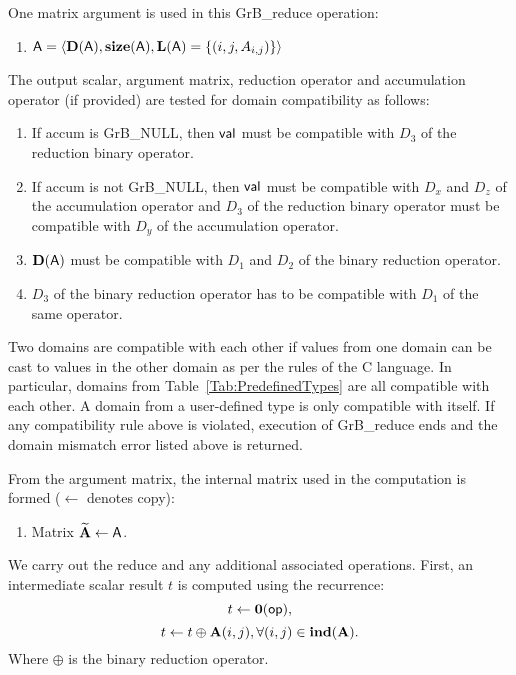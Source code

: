One matrix argument is used in this {\sf GrB\_reduce} operation:
\begin{enumerate}
	\item ${\sf A} = \langle \bold{D}({\sf A}),\bold{size}({\sf A}),
		\bold{L}({\sf A}) = \{(i,j,A_{i,j}) \} \rangle$

\end{enumerate}

The output scalar, argument matrix, reduction operator and accumulation 
operator (if provided) are tested for domain compatibility as follows:
\begin{enumerate}

	\item If {\sf accum} is {\sf GrB\_NULL}, then ${\sf val}$ must be 
    compatible with $D_3$ of the reduction binary operator.

	\item If {\sf accum} is not {\sf GrB\_NULL}, then ${\sf val}$ must be
    compatible with $D_x$ and $D_z$ of the accumulation operator and 
    $D_3$ of the reduction binary operator must be compatible with $D_y$ of the accumulation operator.

	\item $\bold{D}({\sf A})$ must be compatible with $D_1$ and $D_2$ of the binary reduction operator.

        \item $D_3$ of the binary reduction operator has to be compatible with $D_1$ of the same operator.
\end{enumerate}
Two domains are compatible with each other if values from one domain can be cast 
to values in the other domain as per the rules of the C language.
In particular, domains from Table~\ref{Tab:PredefinedTypes} are all compatible 
with each other. A domain from a user-defined type is only compatible with itself.
If any compatibility rule above is violated, execution of {\sf GrB\_reduce} ends
and the domain mismatch error listed above is returned.

From the argument matrix, the internal matrix used in 
the computation is formed ($\leftarrow$ denotes copy):
\begin{enumerate}
	\item Matrix ${\bf \widetilde{A}} \leftarrow {\sf A}$.
\end{enumerate}

We carry out the reduce and any additional 
associated operations.  
First, an intermediate scalar result $t$ is computed using the recurrence:
\[
	t \leftarrow \bold{0}({\sf op}),
\]
\[
	t \leftarrow t \oplus {\bf A}(i,j), \forall (i,j) \in \bold{ind}({\bf A}). 
\]
Where $\oplus$ is the binary reduction operator.

